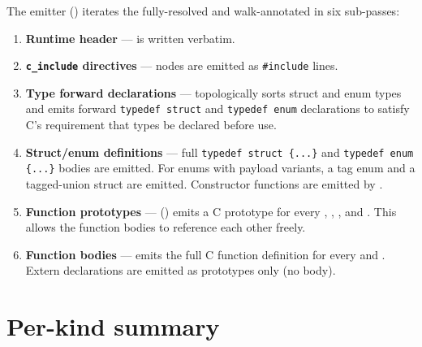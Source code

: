 \pnum
The emitter () iterates the fully-resolved and
walk-annotated  in six sub-passes:

\begin{enumerate}
\item \textbf{Runtime header} —  is written
  verbatim.
\item \textbf{\texttt{c\_include} directives} —  nodes
  are emitted as \texttt{\#include} lines.
\item \textbf{Type forward declarations} — 
  topologically sorts struct and enum types and emits forward
  \texttt{typedef struct} and \texttt{typedef enum} declarations to satisfy
  C's requirement that types be declared before use.
\item \textbf{Struct/enum definitions} — full \texttt{typedef struct \{...\}}
  and \texttt{typedef enum \{...\}} bodies are emitted.  For enums with payload
  variants, a tag enum and a tagged-union struct are emitted.  Constructor
  functions are emitted by .
\item \textbf{Function prototypes} — 
  () emits a C prototype for every
  , ,
  , and .
  This allows the function bodies to reference each other freely.
\item \textbf{Function bodies} —  emits the full C function
  definition for every  and .
  Extern declarations are emitted as prototypes only (no body).
\end{enumerate}

\section{Per-kind summary}
\label{sec:df-summary}

